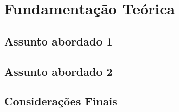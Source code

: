 \chapter{Fundamentação Teórica}\label{cap:fundamentacao}

\section{Assunto abordado 1}

\section{Assunto abordado 2}

\section{Considerações Finais}





